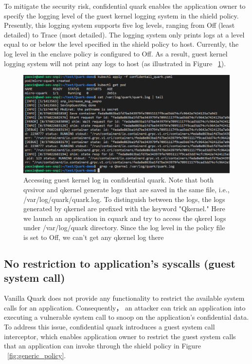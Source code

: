 To mitigate the security risk, confidential quark enables the application owner to specify the logging level of the guest kernel logging system in the shield policy. Presently, this logging system supports five log levels, ranging from Off (least detailed) to Trace (most detailed). The logging system only prints 
logs at a level equal to or below the level specified in the shield policy to host.  Currently, the log level in the enclave policy is configured to Off. As a result, guest kernel logging system will not print any logs to host (as illustrated in Figure ~\ref{fig:cquark_qkernel_log}).
\begin{figure}[H]
    \centering
    \includegraphics[width=1\textwidth]{images/cquark_qkernel_log.png}
    \caption[Accessing guest kernel log in confidential quark]{Accessing guest kernel log in confidential quark.  Note that both qvsivor and qkernel generate logs that are saved in the same file, i.e., /var/log/quark/quark.log. To distinguish between the logs, the logs generated by qkernel are prefixed with the keyword "Qkernel."
    Here we launch an application in cquark and try to access the qkerel logs under /var/log/quark directory. Since the log level in the policy file is set to Off, we can't get any qkernel log there}
    \label{fig:cquark_qkernel_log}
\end{figure}

\subsection{No restriction to application's syscalls (guest system call)}
Vanilla Quark does not provide any functionality to restrict the available system calls for an application. Consequently， an attacker can trick an application into executing a vulnerable system call to snoop on the application's confidential data. To address this issue,  confidential quark introduces a guest 
system call interceptor, which enables application owner to restrict the guest system calls that an application can invoke through the shield policy in Figure ~\ref{fig:generic_policy}.

